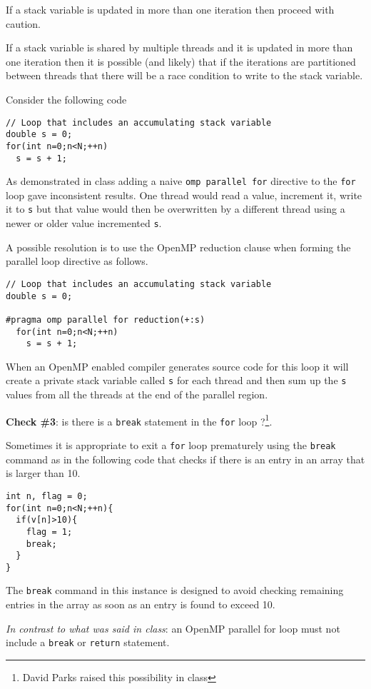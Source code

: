 If a stack variable is updated in more than one iteration then proceed with caution.  

If a stack variable is shared by multiple threads and it is updated in more than one iteration then it is possible (and likely) that if the iterations are partitioned between threads that there will be a race condition to write to the stack variable.

Consider the following code
\begin{verbatim}
// Loop that includes an accumulating stack variable
double s = 0;
for(int n=0;n<N;++n) 
  s = s + 1;
\end{verbatim}
As demonstrated in class adding a naive \texttt{omp parallel for} directive to the \texttt{for} loop gave inconsistent results. One thread would read a value, increment it, write it to \texttt{s} but that value would then be overwritten by a different thread using a newer or older value incremented \texttt{s}.

A possible resolution is to use the OpenMP reduction clause when forming the parallel loop directive as follows.
\begin{verbatim}
// Loop that includes an accumulating stack variable
double s = 0;

#pragma omp parallel for reduction(+:s)
  for(int n=0;n<N;++n) 
    s = s + 1;
\end{verbatim}
When an OpenMP enabled compiler generates source code for this loop it will create a private stack variable called \texttt{s} for each thread and then sum up the \texttt{s} values from all the threads at the end of the parallel region.

{\bf Check \#3}: is there is a \texttt{break} statement in the \texttt{for} loop ?\footnote{David Parks raised this possibility in class}.

Sometimes it is appropriate to exit a \texttt{for} loop prematurely using the \texttt{break} command as in the following code that checks if there is an entry in an array that is larger than 10.
\begin{verbatim}
int n, flag = 0;
for(int n=0;n<N;++n){
  if(v[n]>10){
    flag = 1;
    break;
  }
}
\end{verbatim}
The \texttt{break} command in this instance is designed to avoid checking remaining entries in the array as soon as an entry is found to exceed 10. 

\emph{In contrast to what was said in class}: an OpenMP parallel for loop must not include a \texttt{break} or \texttt{return} statement.

